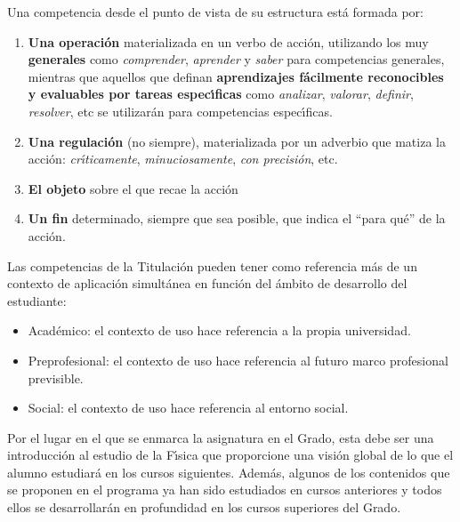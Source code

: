 Una competencia desde el punto de vista de su estructura est\'{a} formada
por: 
\begin{enumerate} [{\bf a) }]
\item {\bf   Una operaci\'{o}n} materializada en un verbo de acci\'{o}n,
utilizando los muy {\bf  generales} como {\it comprender}, {\it aprender}
y {\it saber} para competencias generales, mientras que aquellos que 
definan {\bf  aprendizajes f\'{a}cilmente reconocibles y evaluables por 
tareas espec\'{\i}ficas} como {\it analizar}, {\it valorar}, {\it definir}, 
{\it resolver}, etc se utilizar\'{a}n para competencias espec\'{\i}ficas.
\item {\bf  Una regulaci\'{o}n} (no siempre), materializada por un 
adverbio que matiza la acci\'{o}n: {\it cr\'{\i}ticamente}, 
{\it minuciosamente}, {\it con precisi\'{o}n}, etc.
\item {\bf  El objeto} sobre el que recae la acci\'{o}n
\item {\bf Un fin} determinado, siempre que sea posible, que indica el 
``para qu\'{e}'' de la acci\'{o}n.
\end{enumerate}

Las competencias de la Titulaci\'{o}n pueden tener como referencia
m\'{a}s de un contexto de aplicaci\'{o}n simult\'{a}nea en funci\'{o}n del
\'{a}mbito de desarrollo del estudiante:
\begin{itemize}
\item Acad\'{e}mico: el contexto de uso hace referencia a la
propia universidad.
\item Preprofesional: el contexto de uso hace referencia al futuro marco
profesional previsible.
\item Social:  el contexto de uso hace referencia al entorno social.
\end{itemize}



Por el lugar en el que se enmarca la asignatura en el Grado, 
esta debe ser
 una introducci\'{o}n al estudio de la F\'{\i}sica
 que  proporcione una visi\'{o}n 
global de lo que el alumno estudiar\'{a} en los  cursos siguientes.
 Adem\'{a}s, algunos de los contenidos que se proponen
 en el programa ya han sido 
estudiados en cursos anteriores y todos ellos se desarrollar\'{a}n en 
profundidad en los cursos superiores del Grado. 


%

